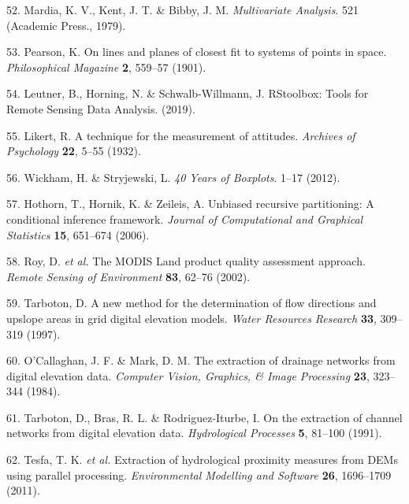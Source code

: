 \documentclass[12pt,oneside]{article}
\begin{document}
\leavevmode\hypertarget{ref-Mardia_et_al_1979}{}%
52. Mardia, K. V., Kent, J. T. \& Bibby, J. M. \emph{Multivariate
Analysis}. 521 (Academic Press., 1979).

\leavevmode\hypertarget{ref-Pearson_1901}{}%
53. Pearson, K. On lines and planes of closest fit to systems of points
in space. \emph{Philosophical Magazine} \textbf{2}, 559--57 (1901).

\leavevmode\hypertarget{ref-Leutner_et_al_2019}{}%
54. Leutner, B., Horning, N. \& Schwalb-Willmann, J. RStoolbox: Tools
for Remote Sensing Data Analysis. (2019).

\leavevmode\hypertarget{ref-Likert_1932}{}%
55. Likert, R. A technique for the measurement of attitudes.
\emph{Archives of Psychology} \textbf{22}, 5--55 (1932).

\leavevmode\hypertarget{ref-Wickham_and_Stryjewski_2012}{}%
56. Wickham, H. \& Stryjewski, L. \emph{40 Years of Boxplots}. 1--17
(2012).

\leavevmode\hypertarget{ref-Hothorn_et_al_2006}{}%
57. Hothorn, T., Hornik, K. \& Zeileis, A. Unbiased recursive
partitioning: A conditional inference framework. \emph{Journal of
Computational and Graphical Statistics} \textbf{15}, 651--674 (2006).

\leavevmode\hypertarget{ref-Roy_et_al_2002}{}%
58. Roy, D. \emph{et al.} The MODIS Land product quality assessment
approach. \emph{Remote Sensing of Environment} \textbf{83}, 62--76
(2002).

\leavevmode\hypertarget{ref-Tarboton_1997}{}%
59. Tarboton, D. A new method for the determination of flow directions
and upslope areas in grid digital elevation models. \emph{Water
Resources Research} \textbf{33}, 309--319 (1997).

\leavevmode\hypertarget{ref-OCallaghan_Mark_1984}{}%
60. O'Callaghan, J. F. \& Mark, D. M. The extraction of drainage
networks from digital elevation data. \emph{Computer Vision, Graphics,
\& Image Processing} \textbf{23}, 323--344 (1984).

\leavevmode\hypertarget{ref-Tarboton_et_al_1991}{}%
61. Tarboton, D., Bras, R. L. \& Rodriguez‐Iturbe, I. On the extraction
of channel networks from digital elevation data. \emph{Hydrological
Processes} \textbf{5}, 81--100 (1991).

\leavevmode\hypertarget{ref-Tesfa_et_al_2011}{}%
62. Tesfa, T. K. \emph{et al.} Extraction of hydrological proximity
measures from DEMs using parallel processing. \emph{Environmental
Modelling and Software} \textbf{26}, 1696--1709 (2011).
\end{document}
